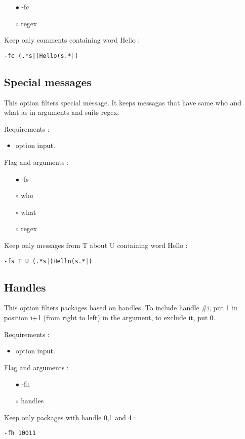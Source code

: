 \documentclass[english]{article}
\begin{document}
\begin{itemize}
\item[$\bullet$] -fc
\item[$\circ$] regex
\end{itemize}
Keep only comments containing word Hello : 
\begin{lstlisting} 
-fc (.*s|)Hello(s.*|)
\end{lstlisting}


\subsection{Special messages}
This option filters special message. It keeps messagas that have same who and what as in arguments and suits regex.  

\noindent Requirements : 
\begin{itemize}
\item option input. 
\end{itemize}
Flag and arguments :
\begin{itemize}
\item[$\bullet$] -fs
\item[$\circ$] who
\item[$\circ$] what
\item[$\circ$] regex
\end{itemize}
Keep only messages from T about U containing word Hello : 
\begin{lstlisting} 
-fs T U (.*s|)Hello(s.*|)
\end{lstlisting}


\subsection{Handles}
This option filters packages based on handles. To include handle \#i, put 1 in position i+1 (from right to left) in the argument, to exclude it, put 0. 

\noindent Requirements : 
\begin{itemize}
\item option input. 
\end{itemize}
Flag and arguments :
\begin{itemize}
\item[$\bullet$] -fh
\item[$\circ$] handles
\end{itemize}
Keep only packages with handle 0,1 and 4 : 
\begin{lstlisting} 
-fh 10011
\end{lstlisting}
\end{document}
